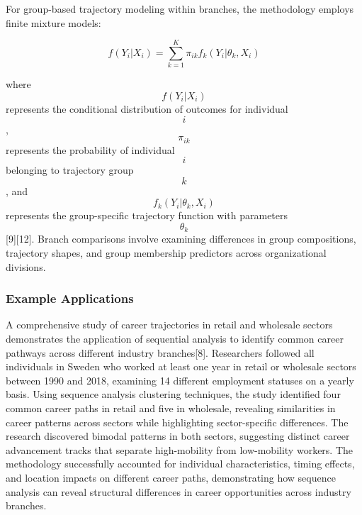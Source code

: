 \documentclass[main.tex]{subfiles}
\begin{document}
For group-based trajectory modeling within branches, the methodology employs finite mixture models:

$$f(Y_i|X_i) = \sum_{k=1}^{K} \pi_{ik} f_k(Y_i|\theta_k, X_i)$$

where $$f(Y_i|X_i)$$ represents the conditional distribution of outcomes for individual $$i$$, $$\pi_{ik}$$ represents the probability of individual $$i$$ belonging to trajectory group $$k$$, and $$f_k(Y_i|\theta_k, X_i)$$ represents the group-specific trajectory function with parameters $$\theta_k$$[9][12]. Branch comparisons involve examining differences in group compositions, trajectory shapes, and group membership predictors across organizational divisions.

\subsubsection{Example Applications}


A comprehensive study of career trajectories in retail and wholesale sectors demonstrates the application of sequential analysis to identify common career pathways across different industry branches[8]. Researchers followed all individuals in Sweden who worked at least one year in retail or wholesale sectors between 1990 and 2018, examining 14 different employment statuses on a yearly basis. Using sequence analysis clustering techniques, the study identified four common career paths in retail and five in wholesale, revealing similarities in career patterns across sectors while highlighting sector-specific differences. The research discovered bimodal patterns in both sectors, suggesting distinct career advancement tracks that separate high-mobility from low-mobility workers. The methodology successfully accounted for individual characteristics, timing effects, and location impacts on different career paths, demonstrating how sequence analysis can reveal structural differences in career opportunities across industry branches.

\end{document}
